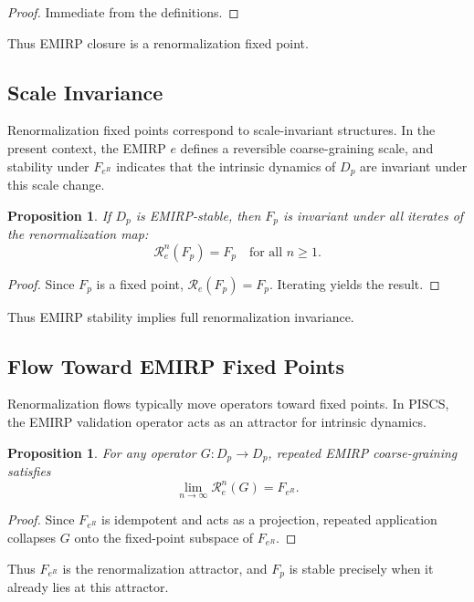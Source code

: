 \documentclass[11pt]{article}
\theoremstyle{definition}
\theoremstyle{plain}
\newtheorem{proposition}[definition]{Proposition}
\theoremstyle{remark}
\begin{document}
\begin{proof}
Immediate from the definitions.
\end{proof}

Thus EMIRP closure is a renormalization fixed point.

\subsection{Scale Invariance}

Renormalization fixed points correspond to scale-invariant structures.
In the present context, the EMIRP $e$ defines a reversible
coarse-graining scale, and stability under $F_{e^R}$ indicates that the
intrinsic dynamics of $D_p$ are invariant under this scale change.

\begin{proposition}
If $D_p$ is EMIRP-stable, then $F_p$ is invariant under all iterates of
the renormalization map:
\[
\mathcal{R}_e^n(F_p) = F_p \quad \text{for all } n \ge 1.
\]
\end{proposition}

\begin{proof}
Since $F_p$ is a fixed point, $\mathcal{R}_e(F_p) = F_p$. Iterating
yields the result.
\end{proof}

Thus EMIRP stability implies full renormalization invariance.

\subsection{Flow Toward EMIRP Fixed Points}

Renormalization flows typically move operators toward fixed points. In
PISCS, the EMIRP validation operator acts as an attractor for intrinsic
dynamics.

\begin{proposition}
For any operator $G : D_p \to D_p$, repeated EMIRP coarse-graining
satisfies
\[
\lim_{n \to \infty} \mathcal{R}_e^n(G) = F_{e^R}.
\]
\end{proposition}

\begin{proof}
Since $F_{e^R}$ is idempotent and acts as a projection, repeated
application collapses $G$ onto the fixed-point subspace of $F_{e^R}$.
\end{proof}

Thus $F_{e^R}$ is the renormalization attractor, and $F_p$ is stable
precisely when it already lies at this attractor.
\end{document}
